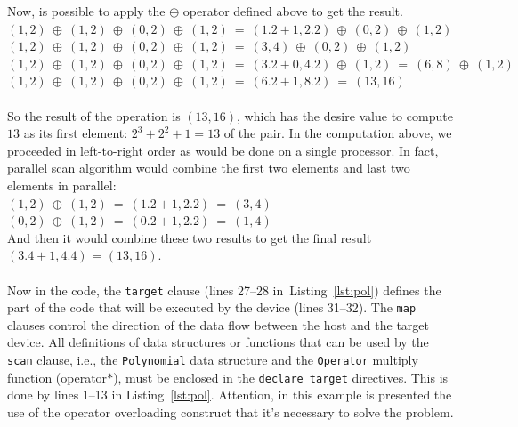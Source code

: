 \documentclass[Ingles]{ic-tese-v1}
\newcommand{\ttt}[1]{{\texttt{#1}}}
\newcommand{\rlst}[1]{Listing~\ref{lst:#1}}
\begin{document}
Now, is possible to apply the $\oplus$ operator defined above to get the result.\\
$(1, 2)\:\oplus\:(1, 2)\:\oplus\:(0, 2)\:\oplus\:(1, 2)\:=\:(1 . 2 + 1, 2 . 2)\:\oplus\:(0, 2)\: \oplus\:(1, 2)$\\
$(1, 2)\:\oplus\:(1, 2)\:\oplus\:(0, 2)\:\oplus\:(1, 2)\:=\:(3, 4)\:\oplus\:(0, 2)\:\oplus\:(1, 2)$\\
$(1, 2)\:\oplus\:(1, 2)\:\oplus\:(0, 2)\:\oplus\:(1, 2)\:=\:(3. 2 + 0, 4 . 2)\:\oplus\:(1, 2)\:=\:(6, 8)\:\oplus\:(1, 2)$\\
$(1, 2)\:\oplus\:(1, 2)\:\oplus\:(0, 2)\:\oplus\:(1, 2)\:=\:(6 . 2 + 1, 8 . 2) \:=\:(13, 16)$\\\\
So the result of the operation is $(13, 16)$, which has the desire value to compute $13$
as its first element: $2^{3} + 2^{2} + 1 = 13$ of the pair.
In the computation above, we proceeded in left-to-right order as would be
done on a single processor. In fact, parallel scan algorithm would
combine the first two elements and last two elements in parallel:\\
$(1, 2) \:\oplus\: (1, 2) \:=\: (1 . 2 + 1, 2 . 2) \:=\: (3, 4)$\\
$(0, 2) \:\oplus\: (1, 2) \:=\: (0 . 2 + 1, 2 . 2) \:=\: (1, 4)$\\
And then it would combine these two results to get the final result $(3 . 4 + 1, 4 . 4)$
= $(13, 16)$.
\\\\
Now in the code, the \ttt{target} clause (lines 27--28 in~\rlst{pol}) defines the part of the code
that will  be  executed by  the device  (lines
31--32).  The \ttt{map} clauses control the direction  of the data flow
between the host and the target device. All definitions of data structures
or functions  that can be used  by the \ttt{scan} clause,  i.e., the
\ttt{Polynomial} data  structure and the \ttt{Operator}  multiply function
(operator$*$),  must   be  enclosed  in  the   \ttt{declare  target}
directives. This is done by lines 1--13 in \rlst{pol}.
Attention, in this example is presented the use of the operator overloading
construct that it's necessary to solve the problem.
\end{document}

